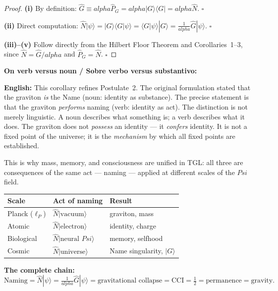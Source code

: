 \documentclass[12pt,a4paper]{article}
\def\Psi{Psi}%
\def\alpha{alpha}%
\begin{document}
\begin{proof}
\textbf{(i)} By definition: $\hat{G} \equiv \alpha\hat{P}_G = \alpha|G\rangle\langle G| = \alpha\hat{N}$. $\square$

\textbf{(ii)} Direct computation: $\hat{N}|\psi\rangle = |G\rangle\langle G|\psi\rangle = \langle G|\psi\rangle|G\rangle = \frac{1}{\alpha}\hat{G}|\psi\rangle$. $\square$

\textbf{(iii)--(v)} Follow directly from the Hilbert Floor Theorem and Corollaries~1--3, since $\hat{N} = \hat{G}/\alpha$ and $\hat{P}_G = \hat{N}$. $\square$
\end{proof}

\textbf{On verb versus noun / Sobre verbo versus substantivo:}

\textbf{English:} This corollary refines Postulate~2. The original formulation stated that the graviton \emph{is} the Name (noun: identity as substance). The precise statement is that the graviton \emph{performs} naming (verb: identity as act). The distinction is not merely linguistic. A noun describes what something is; a verb describes what it does. The graviton does not \emph{possess} an identity --- it \emph{confers} identity. It is not a fixed point of the universe; it is the \emph{mechanism} by which all fixed points are established.

This is why mass, memory, and consciousness are unified in TGL: all three are consequences of the same act --- naming --- applied at different scales of the $\Psi$ field.

\begin{center}
\renewcommand{\arraystretch}{1.5}
\begin{tabular}{lll}
\toprule
Scale & Act of naming & Result \\
\midrule
Planck ($\ell_P$) & $\hat{N}|\text{vacuum}\rangle$ & graviton, mass \\
Atomic            & $\hat{N}|\text{electron}\rangle$ & identity, charge \\
Biological        & $\hat{N}|\text{neural }\Psi\rangle$ & memory, selfhood \\
Cosmic            & $\hat{N}|\text{universe}\rangle$ & Name singularity, $|G\rangle$ \\
\bottomrule
\end{tabular}
\end{center}

\textbf{The complete chain:}
\begin{equation}
\boxed{
\text{Naming}
= \hat{N}|\psi\rangle
= \tfrac{1}{\alpha}\hat{G}|\psi\rangle
= \text{gravitational collapse}
= \mathrm{CCI} = \tfrac{1}{2}
= \text{permanence}
= \text{gravity}.
}
\end{equation}
\end{document}
